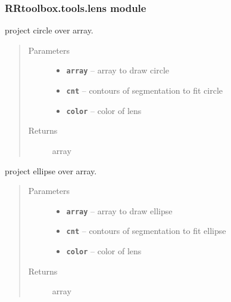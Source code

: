 \documentclass[letterpaper,10pt,english]{sphinxmanual}
\begin{document}
\subsubsection{RRtoolbox.tools.lens module}
\label{RRtoolbox.tools:rrtoolbox-tools-lens-module}\label{RRtoolbox.tools:module-RRtoolbox.tools.lens}

\begin{fulllineitems}
\label{RRtoolbox.tools:RRtoolbox.tools.lens.drawCircle}
project circle over array.
\begin{quote}\begin{description}
\item[{Parameters}] \leavevmode\begin{itemize}
\item {} 
\textbf{\texttt{array}} -- array to draw circle

\item {} 
\textbf{\texttt{cnt}} -- contours of segmentation to fit circle

\item {} 
\textbf{\texttt{color}} -- color of lens

\end{itemize}

\item[{Returns}] \leavevmode
array

\end{description}\end{quote}

\end{fulllineitems}


\begin{fulllineitems}
\label{RRtoolbox.tools:RRtoolbox.tools.lens.drawEllipse}
project ellipse over array.
\begin{quote}\begin{description}
\item[{Parameters}] \leavevmode\begin{itemize}
\item {} 
\textbf{\texttt{array}} -- array to draw ellipse

\item {} 
\textbf{\texttt{cnt}} -- contours of segmentation to fit ellipse

\item {} 
\textbf{\texttt{color}} -- color of lens

\end{itemize}

\item[{Returns}] \leavevmode
array

\end{description}\end{quote}

\end{fulllineitems}
\end{document}
